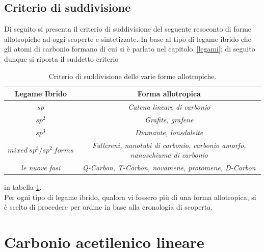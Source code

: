 \documentclass[a4paper,titlepage]{book}
\begin{document}
\section {Criterio di suddivisione}
Di seguito si presenta il criterio di suddivisione del seguente resoconto di forme allotropiche ad oggi scoperte e sintetizzate. In base al tipo di legame ibrido che gli atomi di carbonio formano di cui si è parlato nel capitolo~\ref{legami}; di seguito dunque si riporta il suddetto criterio 
\begin{table}[ht]
	\begin{center}
		\caption{Criterio di suddivisione delle varie forme allotropiche.}
		
		\label{tab:crit} %
		\begin{tabular}{|c|c|} 
			\hline
			\multicolumn{1}{|c|}{Legame Ibrido} & \multicolumn{1}{c|}{Forma allotropica} \\
			\hline
			$sp$  &   \textit{Catena lineare di carbonio} \\
			$sp^2$ &  \textit{Grafite, grafene} \\
			$sp^3$ &    \textit{Diamante, lonsdaleite}\\
			$mixed \: sp^3/sp^2 \: forms$ &    \textit{Fullereni, nanotubi di carbonio, carbonio amorfo, nanoschiuma di carbonio}\\
			\hline
			\textit{le nuove fasi} &\textit{Q-Carbon, T-Carbon, novamene, protomene, D-Carbon} \\ %
			\hline
		\end{tabular}
	\end{center}
\end{table}
in tabella \ref{tab:crit}. \\
Per ogni tipo di legame ibrido, qualora vi fossero più di una forma allotropica, si è scelto di procedere per ordine in base alla cronologia di scoperta.
\chapter{Carbonio acetilenico lineare}
\end{document}
